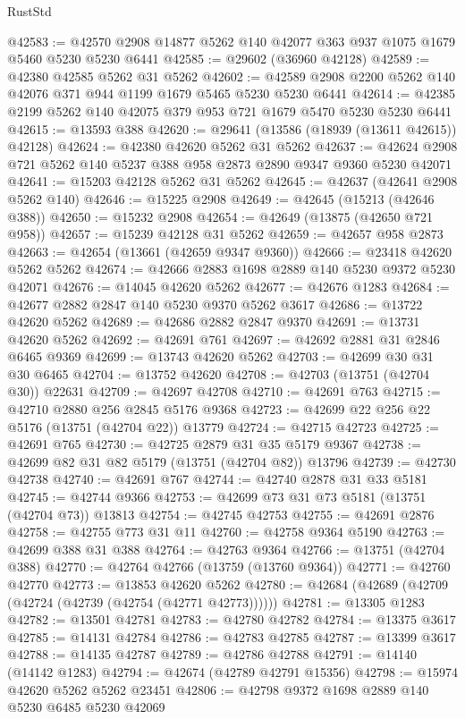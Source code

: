\begin{lexlean}{RustStd}
\begin{coremodule}
@42583 := @42570 @2908 @14877 @5262 @140 @42077 @363 @937 @1075 @1679 @5460 @5230 @5230 @6441
@42585 := @29602 (@36960 @42128)
@42589 := @42380 @42585 @5262 @31 @5262
@42602 := @42589 @2908 @2200 @5262 @140 @42076 @371 @944 @1199 @1679 @5465 @5230 @5230 @6441
@42614 := @42385 @2199 @5262 @140 @42075 @379 @953 @721 @1679 @5470 @5230 @5230 @6441
@42615 := @13593 @388
@42620 := @29641 (@13586 (@18939 (@13611 @42615)) @42128)
@42624 := @42380 @42620 @5262 @31 @5262
@42637 := @42624 @2908 @721 @5262 @140 @5237 @388 @958 @2873 @2890 @9347 @9360 @5230 @42071
@42641 := @15203 @42128 @5262 @31 @5262
@42645 := @42637 (@42641 @2908 @5262 @140)
@42646 := @15225 @2908
@42649 := @42645 (@15213 (@42646 @388))
@42650 := @15232 @2908
@42654 := @42649 (@13875 (@42650 @721 @958))
@42657 := @15239 @42128 @31 @5262
@42659 := @42657 @958 @2873
@42663 := @42654 (@13661 (@42659 @9347 @9360))
@42666 := @23418 @42620 @5262 @5262
@42674 := @42666 @2883 @1698 @2889 @140 @5230 @9372 @5230 @42071
@42676 := @14045 @42620 @5262
@42677 := @42676 @1283
@42684 := @42677 @2882 @2847 @140 @5230 @9370 @5262 @3617
@42686 := @13722 @42620 @5262
@42689 := @42686 @2882 @2847 @9370
@42691 := @13731 @42620 @5262
@42692 := @42691 @761
@42697 := @42692 @2881 @31 @2846 @6465 @9369
@42699 := @13743 @42620 @5262
@42703 := @42699 @30 @31 @30 @6465
@42704 := @13752 @42620
@42708 := @42703 (@13751 (@42704 @30)) @22631
@42709 := @42697 @42708
@42710 := @42691 @763
@42715 := @42710 @2880 @256 @2845 @5176 @9368
@42723 := @42699 @22 @256 @22 @5176 (@13751 (@42704 @22)) @13779
@42724 := @42715 @42723
@42725 := @42691 @765
@42730 := @42725 @2879 @31 @35 @5179 @9367
@42738 := @42699 @82 @31 @82 @5179 (@13751 (@42704 @82)) @13796
@42739 := @42730 @42738
@42740 := @42691 @767
@42744 := @42740 @2878 @31 @33 @5181
@42745 := @42744 @9366
@42753 := @42699 @73 @31 @73 @5181 (@13751 (@42704 @73)) @13813
@42754 := @42745 @42753
@42755 := @42691 @2876
@42758 := @42755 @773 @31 @11
@42760 := @42758 @9364 @5190
@42763 := @42699 @388 @31 @388
@42764 := @42763 @9364
@42766 := @13751 (@42704 @388)
@42770 := @42764 @42766 (@13759 (@13760 @9364))
@42771 := @42760 @42770
@42773 := @13853 @42620 @5262
@42780 := @42684 (@42689 (@42709 (@42724 (@42739 (@42754 (@42771 @42773))))))
@42781 := @13305 @1283
@42782 := @13501 @42781
@42783 := @42780 @42782
@42784 := @13375 @3617
@42785 := @14131 @42784
@42786 := @42783 @42785
@42787 := @13399 @3617
@42788 := @14135 @42787
@42789 := @42786 @42788
@42791 := @14140 (@14142 @1283)
@42794 := @42674 (@42789 @42791 @15356)
@42798 := @15974 @42620 @5262 @5262 @23451
@42806 := @42798 @9372 @1698 @2889 @140 @5230 @6485 @5230 @42069

\end{coremodule}
\end{lexlean}
